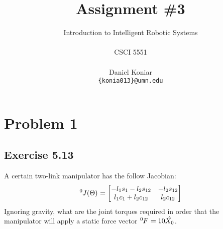 \documentclass[10pt]{article}
\title{\bf Assignment \#3
}
\author{\parbox{4 in}{\centering Introduction to Intelligent Robotic Systems}\\
  CSCI 5551\\ \\
  Daniel Koniar\\
  {\tt\small \{konia013\}@umn.edu}\\
}
\begin{document}
\maketitle
\thispagestyle{empty}
\pagestyle{empty}

\section*{Problem 1}
\subsection*{Exercise 5.13}
A certain two-link manipulator has the follow Jacobian:
\[
\tensor*[^{0}]{J(\Theta)}{} =
\begin{bmatrix}
    -l_{1}s_{1} - l_{2}s_{12}    & -l_{2}s_{12}   \\
    l_{1}c_{1}+l_{2}c_{12}      & l_{2}c_{12}
\end{bmatrix}
\]
Ignoring gravity, what are the joint torques required in order that the manipulator will apply a static force vector \(\tensor*[^{0}]{F}{} = 10 \hat{X_{0}}\).
\end{document}

